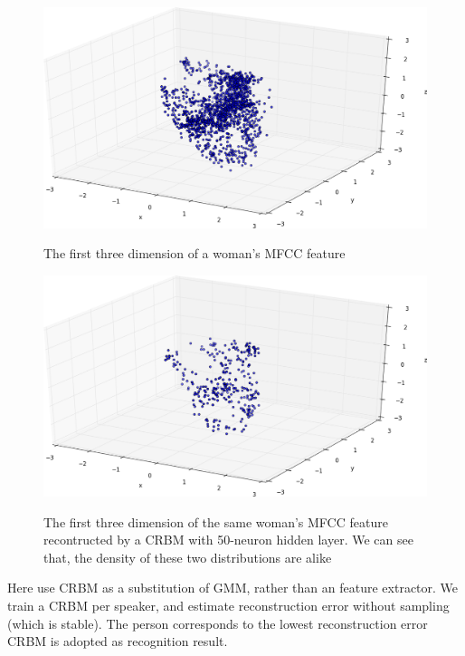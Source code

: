 \begin{enumerate}
			\begin{figure}[!ht]
				\begin{minipage}{0.48\linewidth}
					\centering
					\includegraphics[width=\linewidth]{img/all.trimed.png}
					\caption{The first three dimension of a woman's MFCC feature}
				\end{minipage}
				\hfill
				\begin{minipage}{0.48\linewidth}
					\centering
					\includegraphics[width=\linewidth]{img/50.trimed.png}
					\caption{The first three dimension of the same woman's MFCC feature
					recontructed by a CRBM with 50-neuron hidden layer. We can
					see that, the density of these two distributions are alike}
				\end{minipage}
                \caption{\label{fig:crbm}}
			\end{figure}

			Here use CRBM as a substitution of GMM, rather than
			an feature extractor. We train a CRBM per speaker,
			and estimate reconstruction error without sampling (which is stable).
			The person corresponds to the lowest reconstruction error CRBM is adopted as
			recognition result.


\end{enumerate}
